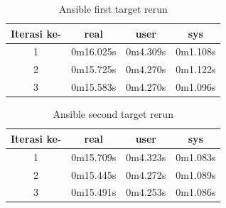 \documentclass[10pt,twoside]{report}
\begin{document}
\begin{adjustwidth}{20pt}{}
	\begin{table}[H]
		\caption{Ansible first target rerun}
		\begin{center}
			\begin{tabular}[c]{|c|c|c|c|}
				\hline
				\multicolumn{1}{|c|}{\textbf{Iterasi ke-}} &
				\multicolumn{1}{c|}{\textbf{real}}         &
				\multicolumn{1}{c|}{\textbf{user}}         &
				\multicolumn{1}{c|}{\textbf{sys}}                                            \\
				\hline
				1                                          & 0m16.025s & 0m4.309s & 0m1.108s \\
				\hline
				2                                          & 0m15.725s & 0m4.270s & 0m1.122s \\
				\hline
				3                                          & 0m15.583s & 0m4.270s & 0m1.096s \\
				\hline
			\end{tabular}
		\end{center}
	\end{table}
	\vspace{-5mm}
	\begin{table}[H]
		\caption{Ansible second target rerun}
		\begin{center}
			\begin{tabular}[c]{|c|c|c|c|}
				\hline
				\multicolumn{1}{|c|}{\textbf{Iterasi ke-}} &
				\multicolumn{1}{c|}{\textbf{real}}         &
				\multicolumn{1}{c|}{\textbf{user}}         &
				\multicolumn{1}{c|}{\textbf{sys}}                                            \\
				\hline
				1                                          & 0m15.709s & 0m4.323s & 0m1.083s \\
				\hline
				2                                          & 0m15.445s & 0m4.272s & 0m1.089s \\
				\hline
				3                                          & 0m15.491s & 0m4.253s & 0m1.086s \\
				\hline
			\end{tabular}
		\end{center}
	\end{table}

\end{adjustwidth}
\end{document}

